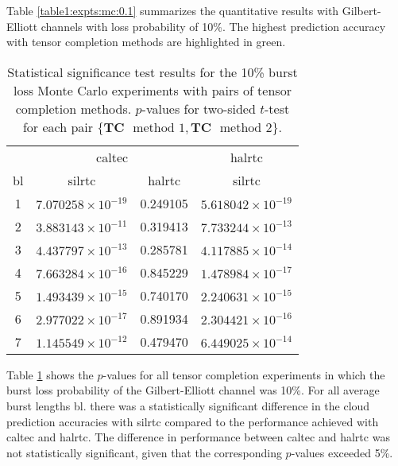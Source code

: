Table \ref{table1:expts:mc:0.1} summarizes the quantitative results with Gilbert-Elliott channels with loss probability of 10\%. The highest prediction accuracy with tensor completion methods are highlighted in green.

\begin{table}[H]
	\caption[Statistical significance results for the 10\% burst loss scenario with no tensor completion]{Statistical significance test results for the 10\% burst loss Monte Carlo experiments with pairs of tensor completion methods. $p$-values for two-sided $t$-test for each pair $\{\textbf{TC} \mbox{ } \text{method 1},\textbf{TC} \mbox{ } \text{method 2}\}$.} \label{table:expts:ttest:tc:0.1}
	\centering
	\begin{adjustbox}{max width = \textwidth}
		\begin{tabular}{|c|cc|c|}
			\hline
			\multicolumn{1}{|c|}{} &
			\multicolumn{2}{c|}{\gls{caltec}} & \multicolumn{1}{c|}{\gls{halrtc}} \\
			\gls{bl} &  \gls{silrtc} &  \gls{halrtc} &  \gls{silrtc} \\
			\hline \hline 
	1 &   $7.070258 \times 10^{-19}$ &  \cellcolor{red!40}     0.249105 &   $5.618042 \times 10^{-19}$ \\
	2 &   $3.883143 \times 10^{-11}$ &    \cellcolor{red!40}   0.319413 &   $7.733244 \times 10^{-13}$ \\
	3 &   $4.437797 \times 10^{-13}$ &    \cellcolor{red!40}   0.285781 &   $4.117885 \times 10^{-14}$ \\
	4 &   $7.663284 \times 10^{-16}$ &   \cellcolor{red!40}    0.845229 &   $1.478984 \times 10^{-17}$ \\
	5 &   $1.493439 \times 10^{-15}$ &      \cellcolor{red!40} 0.740170 &   $2.240631 \times 10^{-15}$ \\
	6 &   $2.977022 \times 10^{-17}$ &  \cellcolor{red!40}     0.891934 &  $2.304421 \times 10^{-16}$ \\
	7 &   $1.145549 \times 10^{-12}$ &   \cellcolor{red!40}    0.479470 &   $6.449025 \times 10^{-14}$ \\
			\hline
		\end{tabular}%
	\end{adjustbox}
\end{table}

Table \ref{table:expts:ttest:tc:0.1} shows the $p$-values for all tensor completion experiments in which the burst loss probability of the Gilbert-Elliott channel was 10\%. For all average burst lengths \gls{bl}. there was a statistically significant difference in the cloud prediction accuracies with \gls{silrtc} compared to the performance achieved with \gls{caltec} and \gls{halrtc}. The difference in performance between \gls{caltec} and \gls{halrtc} was not statistically significant, given that the corresponding $p$-values exceeded 5\%.

